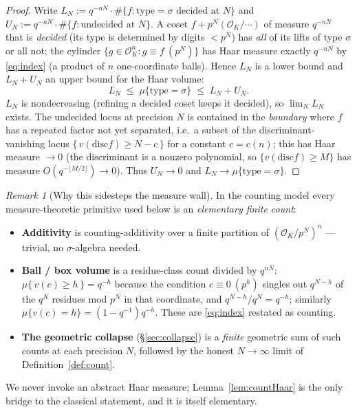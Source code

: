 \documentclass[11pt]{article}
\theoremstyle{definition}
\theoremstyle{remark}
\newtheorem{remark}[theorem]{Remark}
\newcommand{\OK}{\mathcal{O}_K}
\newcommand{\type}{\mathrm{type}}
\newcommand{\disc}{\mathrm{disc}}
\newcommand{\vp}{v}
\begin{document}
\begin{proof}
Write $L_N := q^{-nN}\cdot\#\{f:\type=\sigma\text{ decided at }N\}$ and
$U_N := q^{-nN}\cdot\#\{f:\text{undecided at }N\}$. A coset
$f+p^N(\OK/\cdots)$ of measure $q^{-nN}$ that is \emph{decided} (its type is
determined by digits $<p^N$) has \emph{all} of its lifts of type $\sigma$ or all
not; the cylinder $\{g\in\OK^n: g\equiv f\ (p^N)\}$ has Haar measure exactly
$q^{-nN}$ by \eqref{eq:index} (a product of $n$ one-coordinate balls). Hence $L_N$
is a lower bound and $L_N+U_N$ an upper bound for the Haar volume:
\[
  L_N \;\le\; \mu\{\type=\sigma\}\;\le\; L_N+U_N .
\]
$L_N$ is nondecreasing (refining a decided coset keeps it decided), so
$\lim_N L_N$ exists. The undecided locus at precision $N$ is contained in the
\emph{boundary} where $f$ has a repeated factor not yet separated, i.e.\ a subset
of the discriminant-vanishing locus $\{\,\vp(\disc f)\ge N-c\,\}$ for a constant
$c=c(n)$; this has Haar measure $\to 0$ (the discriminant is a nonzero polynomial,
so $\{\vp(\disc f)\ge M\}$ has measure $O(q^{-\lfloor M/2\rfloor})\to0$). Thus
$U_N\to0$ and $L_N\to\mu\{\type=\sigma\}$.
\end{proof}

\begin{remark}[Why this sidesteps the measure wall]\label{rem:wall}
In the counting model every measure-theoretic primitive used below is an
\emph{elementary finite count}:
\begin{itemize}[nosep]
\item \textbf{Additivity} is counting-additivity over a finite partition of
$(\OK/p^N)^n$ --- trivial, no $\sigma$-algebra needed.
\item \textbf{Ball / box volume} is a residue-class count divided by $q^{nN}$:
$\mu\{\,\vp(c)\ge h\,\}=q^{-h}$ because the condition $c\equiv0\ (p^h)$ singles
out $q^{N-h}$ of the $q^N$ residues mod $p^N$ in that coordinate, and
$q^{N-h}/q^N=q^{-h}$; similarly $\mu\{\vp(c)=h\}=(1-q^{-1})q^{-h}$. These are
\eqref{eq:index} restated as counting.
\item \textbf{The geometric collapse} (\S\ref{sec:collapse}) is a \emph{finite}
geometric sum of such counts at each precision $N$, followed by the honest
$N\to\infty$ limit of Definition~\ref{def:count}.
\end{itemize}
We never invoke an abstract Haar measure; Lemma~\ref{lem:countHaar} is the only
bridge to the classical statement, and it is itself elementary.
\end{remark}
\end{document}
